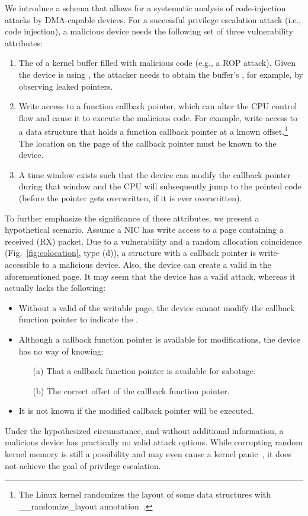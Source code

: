 We introduce a schema that allows for a systematic analysis of code-injection attacks by DMA-capable devices.
For a successful privilege escalation attack (i.e., code injection), a malicious device needs the following set of three vulnerability attributes:
\begin{enumerate}
    \item The \kva{} of a kernel buffer filled with malicious code (e.g., a ROP attack). Given the device is using \iova, the attacker needs to obtain the buffer's \kva{}, for example, by observing leaked pointers. 
    \item Write access to a function callback pointer, which can alter the CPU control flow and cause it to execute the malicious code. For example, write access to a data structure that holds a function callback pointer at a known offset.\footnote{The Linux kernel randomizes the layout of some data structures with \_\_randomize\_layout annotation~\cite{rand_layout}.} The location on the page of the callback pointer must be known to the device.
    \item A time window exists such that the device can modify the callback pointer during that window and the CPU will subsequently jump to the pointed code (before the pointer gets overwritten, if it is ever overwritten).
\end{enumerate}

To further emphasize the significance of these attributes, we present a hypothetical scenario. Assume a NIC has write access to a page containing a received (RX) packet. Due to a \subpage{} vulnerability and a random allocation coincidence (Fig.~\ref{fig:colocation}, type (d)), a structure with a callback pointer is write-accessible to a malicious device. Also, the device can create a valid \mabaf{} in the aforementioned page. It may seem that the device has a valid attack, whereas it actually lacks the following:

\begin{itemize}
    \item Without a valid \kva{} of the writable page, the device cannot modify the callback function pointer to indicate the \mabaf.
    \item Although a callback function pointer is available for modifications, the device has no way of knowing: 
    \begin{enumerate}
        \item[(a)] That a callback function pointer is available for sabotage.
        \item[(b)] The correct offset of the callback function pointer.
    \end{enumerate}
    \item It is not known if the modified callback pointer will be executed.
\end{itemize}

Under the hypothesized circumstance, and without additional information, a malicious device has practically no valid attack options. 
While corrupting random kernel memory is still a possibility and may even cause a kernel panic~\cite{MMT16}, it does not achieve the goal of privilege escalation.
